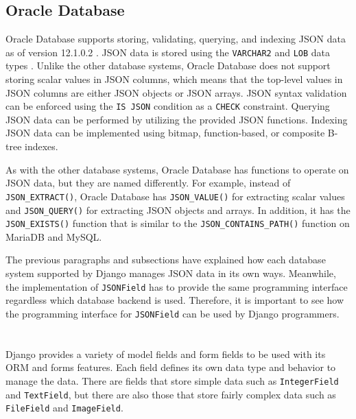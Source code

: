 \subsection{Oracle Database}

Oracle Database supports storing, validating, querying, and indexing JSON data
as of version 12.1.0.2 \cite{oracle:12.1.0.2}. JSON data is stored using the
\verb|VARCHAR2| and \verb|LOB| data types \cite{oracle:json}. Unlike the other
database systems, Oracle Database does not support storing scalar values in
JSON columns, which means that the top-level values in JSON columns are either
JSON objects or JSON arrays. JSON syntax validation can be enforced using the
\verb|IS JSON| condition as a \verb|CHECK| constraint. Querying JSON data can
be performed by utilizing the provided JSON functions. Indexing JSON data can
be implemented using bitmap, function-based, or composite B-tree indexes.

As with the other database systems, Oracle Database has functions to operate on
JSON data, but they are named differently. For example, instead of
\verb|JSON_EXTRACT()|, Oracle Database has \verb|JSON_VALUE()| for extracting
scalar values and \verb|JSON_QUERY()| for extracting JSON objects and arrays.
In addition, it has the \verb|JSON_EXISTS()| function that is similar to the
\verb|JSON_CONTAINS_PATH()| function on MariaDB and MySQL.

The previous paragraphs and subsections have explained how each database
system supported by Django manages JSON data in its own ways. Meanwhile, the
implementation of \verb|JSONField| has to provide the same programming
interface regardless which database backend is used. Therefore, it is important
to see how the programming interface for \verb|JSONField| can be used by Django
programmers.

\section{}

Django provides a variety of model fields and form fields to be used with its
ORM and forms features. Each field defines its own data type and behavior to
manage the data. There are fields that store simple data such as
\verb|IntegerField| and \verb|TextField|, but there are also those that store
fairly complex data such as \verb|FileField| and \verb|ImageField|.

